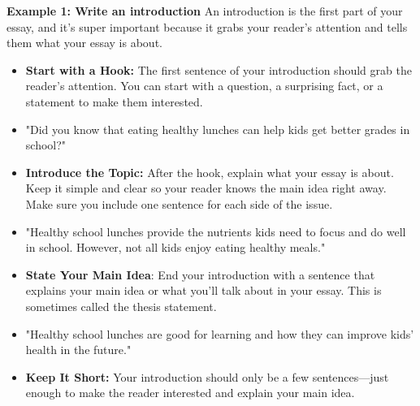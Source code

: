 \documentclass[12pt]{article}
\begin{document}
\vspace{1em}

\begin{tcolorbox}[colframe=black!60, colback=white, 
coltitle=black, colbacktitle=black!15, fonttitle=\bfseries\Large, 
title=Examples, halign title=center, left=10pt, right=10pt, top=10pt, bottom=15pt]

\textbf{Example 1: Write an introduction}
An introduction is the first part of your essay, and it’s super important because it grabs your reader’s attention and tells them what your essay is about.  
    \begin{itemize}
        \item \textbf{Start with a Hook: }The first sentence of your introduction should grab the reader’s attention. You can start with a question, a surprising fact, or a statement to make them interested. 
         \end{itemize}
        \begin{itemize}
            \item "Did you know that eating healthy lunches can help kids get better grades in school?" 
        \end{itemize}
         \begin{itemize}
        \item \textbf{Introduce the Topic: } After the hook, explain what your essay is about. Keep it simple and clear so your reader knows the main idea right away. Make sure you include one sentence for each side of the issue.
          \end{itemize}
        \begin{itemize}
            \item "Healthy school lunches provide the nutrients kids need to focus and do well in school. However, not all kids enjoy eating healthy meals."
        \end{itemize}
          \begin{itemize}
        \item \textbf{State Your Main Idea}: End your introduction with a sentence that explains your main idea or what you’ll talk about in your essay. This is sometimes called the thesis statement. 
        \end{itemize}
        \begin{itemize}
            \item "Healthy school lunches are good for learning and how they can improve kids’ health in the future."
        \end{itemize}
        \begin{itemize}
        \item \textbf{Keep It Short:} Your introduction should only be a few sentences—just enough to make the reader interested and explain your main idea. 
        \end{itemize}


\end{tcolorbox}
\end{document}
